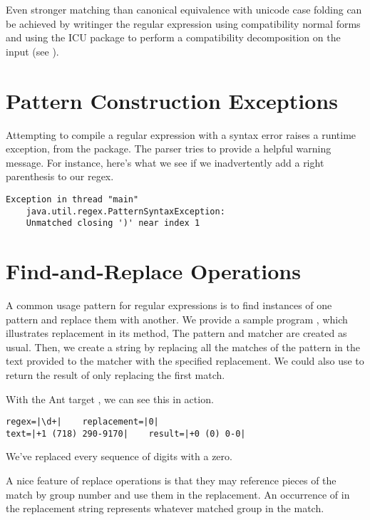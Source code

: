 Even stronger matching than canonical equivalence with unicode case
folding can be achieved by writinger the regular expression using
compatibility normal forms and using the ICU package to perform a
compatibility decomposition on the input (see
).


\section{Pattern Construction Exceptions}

Attempting to compile a regular expression with a syntax error raises
a runtime exception,  from the
 package.  The parser tries to provide a helpful
warning message.  For instance, here's what we see if we inadvertently
add a right parenthesis to our regex.
%
\begin{verbatim}
Exception in thread "main" 
    java.util.regex.PatternSyntaxException:  
    Unmatched closing ')' near index 1
\end{verbatim}


\section{Find-and-Replace Operations}\label{section:regex-replace}

A common usage pattern for regular expressions is to find instances of
one pattern and replace them with another.  We provide a sample
program , which illustrates replacement in
its  method,
%
%
The pattern and matcher are created as usual.  Then, we create
a string by replacing all the matches of the pattern in the text
provided to the matcher with the specified replacement.  We could
also use  to return the result of only replacing
the first match.

With the Ant target , we can see this in action.
%
\begin{verbatim}
regex=|\d+|    replacement=|0|    
text=|+1 (718) 290-9170|    result=|+0 (0) 0-0|
\end{verbatim}
%
We've replaced every sequence of digits with a zero.  

A nice feature of replace operations is that they may reference
pieces of the match by group number and use them in the replacement.
An occurrence of  in the replacement string
represents whatever matched group  in the match.

